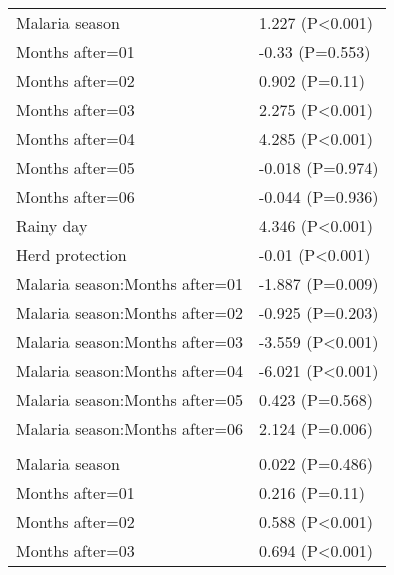 \documentclass[]{article}
\begin{document}
\begin{longtable}[t]{ll}
\hspace{1em}Malaria season & 1.227 (P<0.001)\\
\hspace{1em}Months after=01 & -0.33 (P=0.553)\\
\hspace{1em}Months after=02 & 0.902 (P=0.11)\\
\hspace{1em}Months after=03 & 2.275 (P<0.001)\\
\hspace{1em}Months after=04 & 4.285 (P<0.001)\\
\hspace{1em}Months after=05 & -0.018 (P=0.974)\\
\hspace{1em}Months after=06 & -0.044 (P=0.936)\\
\hspace{1em}Rainy day & 4.346 (P<0.001)\\
\hspace{1em}Herd protection & -0.01 (P<0.001)\\
\hspace{1em}Malaria season:Months after=01 & -1.887 (P=0.009)\\
\hspace{1em}Malaria season:Months after=02 & -0.925 (P=0.203)\\
\hspace{1em}Malaria season:Months after=03 & -3.559 (P<0.001)\\
\hspace{1em}Malaria season:Months after=04 & -6.021 (P<0.001)\\
\hspace{1em}Malaria season:Months after=05 & 0.423 (P=0.568)\\
\hspace{1em}Malaria season:Months after=06 & 2.124 (P=0.006)\\
\addlinespace[1.5em]
\multicolumn{2}{l}{\textbf{Temporary field worker}}\\
\hspace{1em}Malaria season & 0.022 (P=0.486)\\
\hspace{1em}Months after=01 & 0.216 (P=0.11)\\
\hspace{1em}Months after=02 & 0.588 (P<0.001)\\
\hspace{1em}Months after=03 & 0.694 (P<0.001)\\

\end{longtable}
\end{document}
